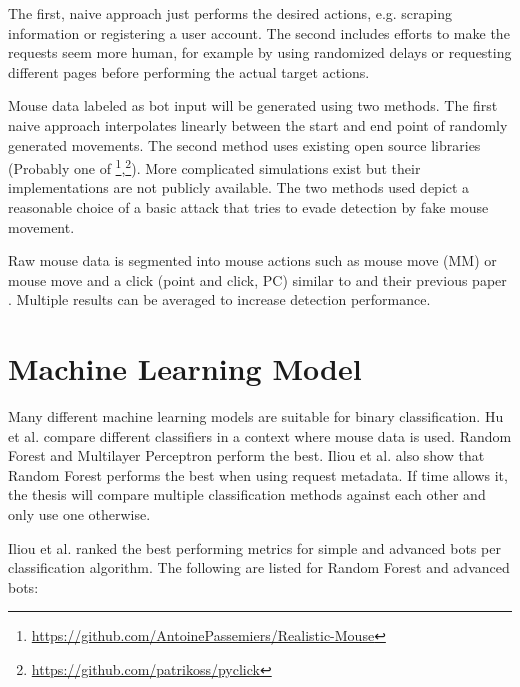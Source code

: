 \documentclass[
    fontsize=12pt,
    headings=small,
    parskip=half,           %
    bibliography=totoc,
    numbers=noenddot,       %
    open=any,               %
    final                   %
    ]{scrreprt}
\begin{document}
The first, naive approach just performs the desired actions, e.g. scraping information or registering a user account. The second includes efforts to make the requests seem more human, for example by using randomized delays or requesting different pages before performing the actual target actions.

Mouse data labeled as bot input will be generated using two methods. The first naive approach interpolates linearly between the start and end point of randomly generated movements. The second method uses existing open source libraries (Probably one of \footnote{\url{https://github.com/AntoinePassemiers/Realistic-Mouse}},\footnote{\url{https://github.com/patrikoss/pyclick}}). More complicated simulations exist but their implementations are not publicly available. \cite{8275816} \cite{Nazar2003} The two methods used depict a reasonable choice of a basic attack that tries to evade detection by fake mouse movement.

Raw mouse data is segmented into mouse actions such as mouse move (MM) or mouse move and a click (point and click, PC) similar to \cite{9111596} and their previous paper \cite{DBLP:journals/corr/abs-1810-04668}. Multiple results can be averaged to increase detection performance.


\section{Machine Learning Model}

Many different machine learning models are suitable for binary classification. Hu et al. \cite{8275816} compare different classifiers in a context where mouse data is used. Random Forest and Multilayer Perceptron perform the best.
Iliou et al. \cite{10.1145/3339252.3339267} also show that Random Forest performs the best when using request metadata.
If time allows it, the thesis will compare multiple classification methods against each other and only use one otherwise.

Iliou et al. \cite{10.1145/3339252.3339267} ranked the best performing metrics for simple and advanced bots per classification algorithm. The following are listed for Random Forest and advanced bots:
\end{document}
